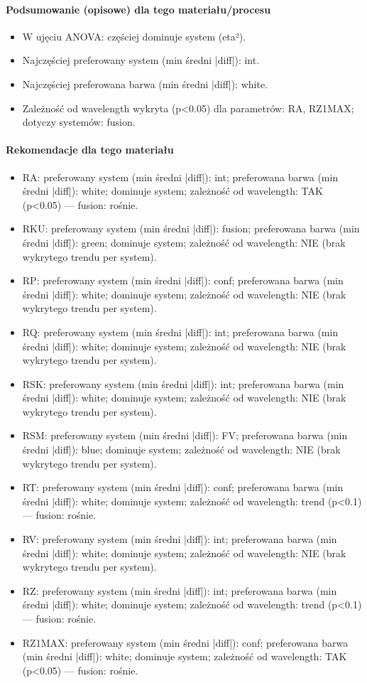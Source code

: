 \documentclass[
  10pt,
]{article}
\begin{document}
\paragraph{Podsumowanie (opisowe) dla tego materiału/procesu}
\begin{itemize}
\item W ujęciu ANOVA: częściej dominuje system (eta²).
\item Najczęściej preferowany system (min średni |diff|): int.
\item Najczęściej preferowana barwa (min średni |diff|): white.
\item Zależność od wavelength wykryta (p<0.05) dla parametrów: RA, RZ1MAX; dotyczy systemów: fusion.
\end{itemize}
\paragraph{Rekomendacje dla tego materiału}
\begin{itemize}
\item RA: preferowany system (min średni |diff|): int; preferowana barwa (min średni |diff|): white; dominuje system; zależność od wavelength: TAK (p<0.05) — fusion: rośnie.
\item RKU: preferowany system (min średni |diff|): fusion; preferowana barwa (min średni |diff|): green; dominuje system; zależność od wavelength: NIE (brak wykrytego trendu per system).
\item RP: preferowany system (min średni |diff|): conf; preferowana barwa (min średni |diff|): white; dominuje system; zależność od wavelength: NIE (brak wykrytego trendu per system).
\item RQ: preferowany system (min średni |diff|): int; preferowana barwa (min średni |diff|): white; dominuje system; zależność od wavelength: NIE (brak wykrytego trendu per system).
\item RSK: preferowany system (min średni |diff|): int; preferowana barwa (min średni |diff|): white; dominuje system; zależność od wavelength: NIE (brak wykrytego trendu per system).
\item RSM: preferowany system (min średni |diff|): FV; preferowana barwa (min średni |diff|): blue; dominuje system; zależność od wavelength: NIE (brak wykrytego trendu per system).
\item RT: preferowany system (min średni |diff|): conf; preferowana barwa (min średni |diff|): white; dominuje system; zależność od wavelength: trend (p<0.1) — fusion: rośnie.
\item RV: preferowany system (min średni |diff|): int; preferowana barwa (min średni |diff|): white; dominuje system; zależność od wavelength: NIE (brak wykrytego trendu per system).
\item RZ: preferowany system (min średni |diff|): int; preferowana barwa (min średni |diff|): white; dominuje system; zależność od wavelength: trend (p<0.1) — fusion: rośnie.
\item RZ1MAX: preferowany system (min średni |diff|): conf; preferowana barwa (min średni |diff|): white; dominuje system; zależność od wavelength: TAK (p<0.05) — fusion: rośnie.
\end{itemize}
\end{document}

